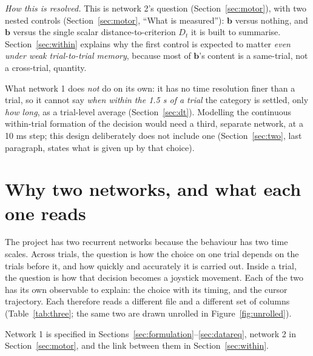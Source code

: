 \documentclass[11pt,a4paper]{article}
\newcommand{\vect}[1]{\bm{#1}}
\begin{document}
\begin{enumerate}[leftmargin=*]
      \emph{How this is resolved.} This is network 2's question (Section~\ref{sec:motor}),
      with two nested controls (Section~\ref{sec:motor}, ``What is measured''): $\vect{b}$
      versus nothing, and $\vect{b}$ versus the single scalar distance-to-criterion $D_t$
      it is built to summarise. Section~\ref{sec:within} explains why the first control is
      expected to matter \emph{even under weak trial-to-trial memory}, because most of
      $\vect{b}$'s content is a same-trial, not a cross-trial, quantity.
\end{enumerate}

What network 1 does \emph{not} do on its own: it has no time resolution finer than a
trial, so it cannot say \emph{when within the 1.5 s of a trial} the category is settled,
only \emph{how long}, as a trial-level average (Section~\ref{sec:dt}). Modelling the
continuous within-trial formation of the decision would need a third, separate network,
at a 10 ms step; this design deliberately does not include one (Section~\ref{sec:two},
last paragraph, states what is given up by that choice).

\section{Why two networks, and what each one reads}
\label{sec:three}
\label{sec:two}

The project has two recurrent networks because the behaviour has two time scales.
Across trials, the question is how the choice on one trial depends on the trials before
it, and how quickly and accurately it is carried out. Inside a trial, the question is how
that decision becomes a joystick movement. Each of the two has its own observable to
explain: the choice with its timing, and the cursor trajectory. Each therefore reads a
different file and a different set of columns (Table~\ref{tab:three}; the same two are
drawn unrolled in Figure~\ref{fig:unrolled}).

Network 1 is specified in Sections~\ref{sec:formulation}--\ref{sec:datareq},
network 2 in Section~\ref{sec:motor}, and the link between them in
Section~\ref{sec:within}.
\end{document}
